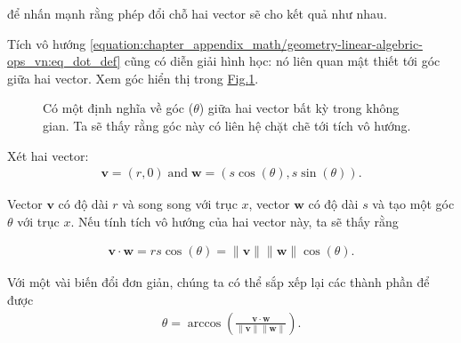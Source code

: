 \documentclass[letterpaper,11pt,english]{sphinxmanual}
\begin{document}
để nhấn mạnh rằng phép đổi chỗ hai vector sẽ cho kết quả như nhau.



Tích vô hướng \eqref{equation:chapter_appendix_math/geometry-linear-algebric-ops_vn:eq_dot_def} cũng có diễn giải hình học: nó liên
quan mật thiết tới góc giữa hai vector. Xem góc hiển thị trong
\hyperref[\detokenize{chapter_appendix_math/geometry-linear-algebric-ops_vn:fig-angle}]{Fig.\@ \ref{\detokenize{chapter_appendix_math/geometry-linear-algebric-ops_vn:fig-angle}}}.



\begin{figure}[H]
\centering
\capstart

\noindent{}
\caption{Có một định nghĩa về góc (\(\theta\)) giữa hai vector bất kỳ
trong không gian. Ta sẽ thấy rằng góc này có liên hệ chặt chẽ tới
tích vô hướng.}\label{\detokenize{chapter_appendix_math/geometry-linear-algebric-ops_vn:id6}}\label{\detokenize{chapter_appendix_math/geometry-linear-algebric-ops_vn:fig-angle}}\end{figure}



Xét hai vector:
\begin{equation}\label{equation:chapter_appendix_math/geometry-linear-algebric-ops_vn:chapter_appendix_math/geometry-linear-algebric-ops_vn:3}
\begin{split}\mathbf{v} = (r,0) \; \text{and} \; \mathbf{w} = (s\cos(\theta), s \sin(\theta)).\end{split}
\end{equation}


Vector \(\mathbf{v}\) có độ dài \(r\) và song song với trục
\(x\), vector \(\mathbf{w}\) có độ dài \(s\) và tạo một góc
\(\theta\) với trục \(x\). Nếu tính tích vô hướng của hai vector
này, ta sẽ thấy rằng




\begin{equation}\label{equation:chapter_appendix_math/geometry-linear-algebric-ops_vn:chapter_appendix_math/geometry-linear-algebric-ops_vn:4}
\begin{split}\mathbf{v}\cdot\mathbf{w} = rs\cos(\theta) = \|\mathbf{v}\|\|\mathbf{w}\|\cos(\theta).\end{split}
\end{equation}


Với một vài biến đổi đơn giản, chúng ta có thể sắp xếp lại các thành
phần để được
\begin{equation}\label{equation:chapter_appendix_math/geometry-linear-algebric-ops_vn:chapter_appendix_math/geometry-linear-algebric-ops_vn:5}
\begin{split}\theta = \arccos\left(\frac{\mathbf{v}\cdot\mathbf{w}}{\|\mathbf{v}\|\|\mathbf{w}\|}\right).\end{split}
\end{equation}
\end{document}
